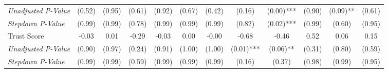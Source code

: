\begin{tabular}{l c c c c c c c c c c c}
\quad \textit{Unadjusted P-Value} & (0.52) & (0.95) & (0.61) & (0.92) & (0.67) & (0.42) & (0.16) & (0.00)*** & (0.90) & (0.09)** & (0.61) \\
\quad \textit{Stepdown P-Value} & (0.99) & (0.99) & (0.78) & (0.99) & (0.99) & (0.99) & (0.82) & (0.02)*** & (0.99) & (0.60) & (0.95) \\
Trust Score & -0.03 & 0.01 & -0.29 & -0.03 & 0.00 & -0.00 & -0.68 & -0.46 & 0.52 & 0.06 & 0.15 \\
\quad \textit{Unadjusted P-Value} & (0.90) & (0.97) & (0.24) & (0.91) & (1.00) & (1.00) & (0.01)*** & (0.06)** & (0.31) & (0.80) & (0.59) \\
\quad \textit{Stepdown P-Value} & (0.99) & (0.99) & (0.59) & (0.99) & (0.99) & (0.99) & (0.16) & (0.37) & (0.98) & (0.99) & (0.95) \\
\bottomrule
\end{tabular}
